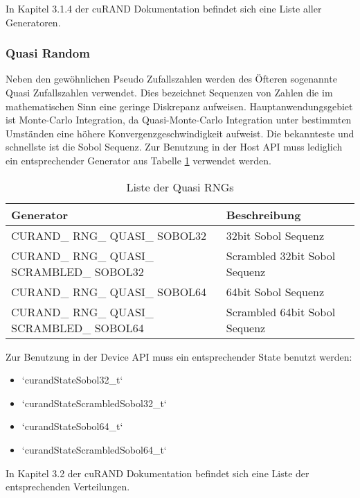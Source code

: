 			In Kapitel 3.1.4 der cuRAND Dokumentation befindet sich eine Liste aller Generatoren. \autocite{curandDoc}
					
			\subsubsection{Quasi Random} 
			Neben den gewöhnlichen Pseudo Zufallszahlen werden des Öfteren sogenannte Quasi Zufallszahlen verwendet. Dies bezeichnet Sequenzen von Zahlen die im mathematischen Sinn eine geringe Diskrepanz aufweisen. Hauptanwendungsgebiet ist Monte-Carlo Integration, da Quasi-Monte-Carlo Integration unter bestimmten Umständen eine höhere Konvergenzgeschwindigkeit aufweist. Die bekannteste und schnellste ist die Sobol Sequenz. Zur Benutzung in der Host \Gls{API} muss lediglich ein entsprechender Generator aus Tabelle \ref{tab5:qrng} verwendet werden.
			\begin{table}[h]
			\centering
			\begin{tabular}{|l|l|}
				\hline
				\textbf{Generator} & \textbf{Beschreibung} \\ \hline\hline
				CURAND\_ RNG\_ QUASI\_ SOBOL32     & 32bit Sobol Sequenz \\ \hline
				CURAND\_ RNG\_ QUASI\_ SCRAMBLED\_ SOBOL32 & Scrambled 32bit Sobol Sequenz \\ \hline
				CURAND\_ RNG\_ QUASI\_ SOBOL64 & 64bit Sobol Sequenz \\ \hline
				CURAND\_ RNG\_ QUASI\_ SCRAMBLED\_ SOBOL64 & Scrambled 64bit Sobol Sequenz \\ \hline\bottomrule
			\end{tabular}
			\caption{Liste der Quasi RNGs}
			\label{tab5:qrng}
			\end{table}
			
			Zur Benutzung in der Device \Gls{API} muss ein entsprechender State benutzt werden:
			\begin{itemize}
			\item \li`curandStateSobol32_t`
			\item \li`curandStateScrambledSobol32_t`
			\item \li`curandStateSobol64_t`
			\item \li`curandStateScrambledSobol64_t`
			\end{itemize}
			
			In Kapitel 3.2 der cuRAND Dokumentation befindet sich eine Liste der entsprechenden Verteilungen. \autocite{curandDoc}

			\newpage						
						
